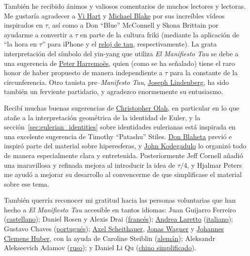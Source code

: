 También he recibido ánimos y valiosos comentarios de muchos lectores y lectoras. Me gustaría agradecer a \href{http://www.youtube.com/watch?v=jG7vhMMXagQ}{Vi Hart} y \href{http://www.youtube.com/watch?v=3174T-3-59Q}{Michael Blake} por sus increíbles vídeos inspirados en $\tau$, así como a Don ``Blue'' McConnell y Skona Brittain por ayudarme a convertir a $\tau$ en parte de la cultura friki (mediante la aplicación de ``la hora en $\tau$'' para iPhone y el \href{http://www.sbcrafts.net/clocks/}{reloj de tau}, respectivamente). La grata interpretación del símbolo del yin-yang que utiliza \emph{El Manifiesto Tau} se debe a una sugerencia de \href{http://www.harremoes.dk/Peter/}{Peter Harremo\"{e}s}, quien (como se ha señalado) tiene el raro honor de haber propuesto de manera independiente a $\tau$ para la constante de la circunferencia. Otro tauista pre--\emph{Manifesto Tau}, \href{https://sites.google.com/site/taubeforeitwascool/}{Joseph Lindenberg}, ha sido también un ferviente partidario, y agradezco enormemente su entusiasmo. 

Recibí muchas buenas sugerencias de \href{http://christopherolah.wordpress.com/about-me}{Christopher Olah}, en particular en lo que atañe a la interpretación geométrica de la identidad de Euler, y la sección~\ref{sec:eulerian_identities} sobre identidades eulerianas está inspirada en una excelente sugerencia de Timothy ``Patashu'' Stiles. \href{http://www.blahedo.org/blog/archives/001083.html}{Don Blaheta} previó e inspiró parte del material sobre hiperesferas, y \href{http://spikedmath.com/forum/viewtopic.php?f=30&t=147\#p1577}{John Kodegadulo} lo organizó todo de manera especialmente clara y entretenida. Posteriormente Jeff Cornell añadió una maravillosa y refinada mejora al introducir la idea de $\tau/4$, y Hjalmar Peters me ayudó a mejorar su desarrollo al convencerme de que simplificase el material sobre ese tema. 

También querría reconocer mi gratitud hacia las personas voluntarias que han hecho a \emph{El Manifiesto Tau} accesible en tantos idiomas: Juan Guijarro Ferreiro (\href{https://tauday.com/el-manifiesto-tau}{castellano}); Daniel Rosen y Alexis Drai (\href{https://tauday.com/le-manifeste-de-tau}{francés}); \href{https://iwilare.com/}{Andrea Laretto} (\href{https://tauday.com/il-tau-manifesto}{italiano}); Gustavo Chaves (\href{https://tauday.com/o-manifesto-tau}{portugués}); \href{https://www.linkedin.com/in/axelscheithauer/}{Axel Scheithauer}, \href{https://blog.purpureus.net/about}{Jonas Wagner} y \href{https://www.blogger.com/profile/05561964491693491031}{Johannes Clemens Huber}, con la ayuda de Caroline Steiblin (\href{https://tauday.com/das-tau-manifest}{alemán}); Aleksandr Alekseevich Adamov (\href{https://tauday.com/tau-manifesto-ru}{ruso}); y Daniel Li Qu (\href{https://tauday.com/tau-manifesto-cn}{chino simplificado}).

